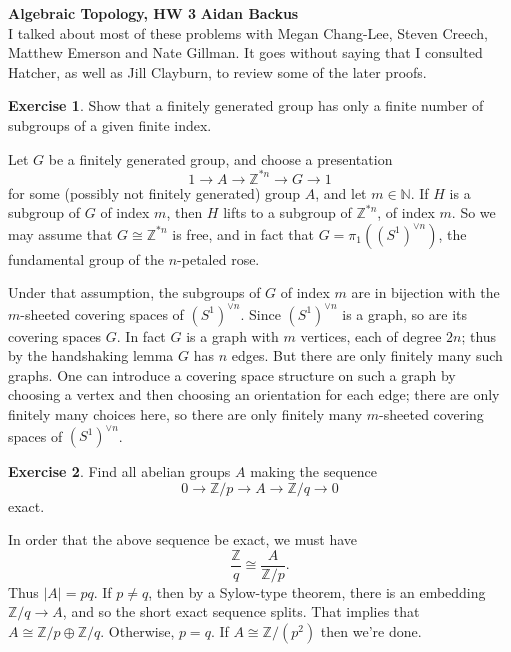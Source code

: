 \documentclass[10pt]{article}
\newcommand{\NN}{\mathbb{N}}
\newcommand{\ZZ}{\mathbb{Z}}
\theoremstyle{definition}
\newtheorem{exer}{Exercise}
\begin{document}
\noindent
\large\textbf{Algebraic Topology, HW 3} \hfill \textbf{Aidan Backus} \\


I talked about most of these problems with Megan Chang-Lee, Steven Creech, Matthew Emerson and Nate Gillman.
It goes without saying that I consulted Hatcher, as well as Jill Clayburn, to review some of the later proofs.

\begin{exer}
Show that a finitely generated group has only a finite number of subgroups of a given finite index.
\end{exer}

Let $G$ be a finitely generated group, and choose a presentation
$$1 \to A \to \ZZ^{*n} \to G \to 1$$
for some (possibly not finitely generated) group $A$, and let $m \in \NN$.
If $H$ is a subgroup of $G$ of index $m$, then $H$ lifts to a subgroup of $\ZZ^{*n}$, of index $m$.
So we may assume that $G \cong \ZZ^{*n}$ is free, and in fact that $G = \pi_1((S^1)^{\vee n})$, the fundamental group of the $n$-petaled rose.

Under that assumption, the subgroups of $G$ of index $m$ are in bijection with the $m$-sheeted covering spaces of $(S^1)^{\vee n}$.
Since $(S^1)^{\vee n}$ is a graph, so are its covering spaces $G$.
In fact $G$ is a graph with $m$ vertices, each of degree $2n$; thus by the handshaking lemma $G$ has $n$ edges.
But there are only finitely many such graphs.
One can introduce a covering space structure on such a graph by choosing a vertex and then choosing an orientation for each edge; there are only finitely many choices here, so there are only finitely many $m$-sheeted covering spaces of $(S^1)^{\vee n}$.

\begin{exer}
Find all abelian groups $A$ making the sequence
$$0 \to \ZZ/p \to A \to \ZZ/q \to 0$$
exact.
\end{exer}

In order that the above sequence be exact, we must have
$$\frac{\ZZ}{q} \cong \frac{A}{\ZZ/p}.$$
Thus $|A| = pq$.
If $p \neq q$, then by a Sylow-type theorem, there is an embedding $\ZZ/q \to A$, and so the short exact sequence splits.
That implies that $A \cong \ZZ/p \oplus \ZZ/q$.
Otherwise, $p = q$. If $A \cong \ZZ/(p^2)$ then we're done.
\end{document}
